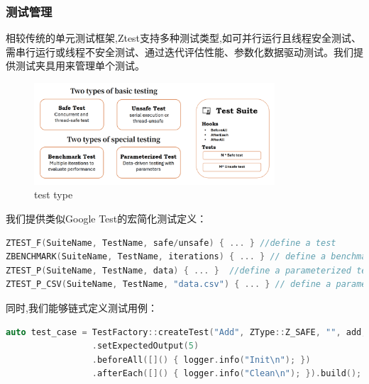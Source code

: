 \documentclass{article}
\begin{document}
\subsubsection{测试管理}


相较传统的单元测试框架,Ztest支持多种测试类型,如可并行运行且线程安全测试、需串行运行或线程不安全测试、通过迭代评估性能、参数化数据驱动测试。我们提供测试夹具用来管理单个测试。

\begin{figure}[H]
    \centering
    \includegraphics[width=0.8\textwidth]{img/types.png} %
    \caption{ test type}
    \label{fig:test types }
\end{figure}
我们提供类似Google Test的宏简化测试定义：
\begin{framed}
    \begin{lstlisting}[language=C++]
ZTEST_F(SuiteName, TestName, safe/unsafe) { ... } //define a test 
ZBENCHMARK(SuiteName, TestName, iterations) { ... } // define a benchmark
ZTEST_P(SuiteName, TestName, data) { ... }  //define a parameterized test
ZTEST_P_CSV(SuiteName, TestName, "data.csv") { ... } // define a parameterized test with csv data
\end{lstlisting}
\end{framed}

同时,我们能够链式定义测试用例：
\begin{framed}
    \begin{lstlisting}[language=C++]
auto test_case = TestFactory::createTest("Add", ZType::Z_SAFE, "", add, 2, 3)
                 .setExpectedOutput(5)
                 .beforeAll([]() { logger.info("Init\n"); })          
                 .afterEach([]() { logger.info("Clean\n"); }).build();
                \end{lstlisting}
\end{framed}
\end{document}

